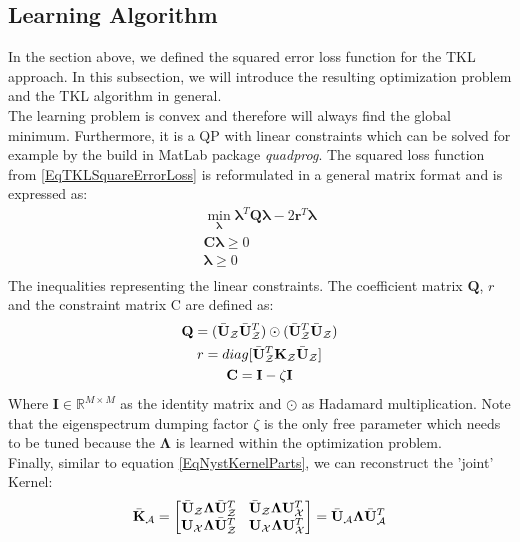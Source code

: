 \subsection{Learning Algorithm}\label{InSubSecLearnAlgo}
In the section above, we defined the squared error loss function for the \acs{TKL} approach.
In this subsection, we will introduce the resulting optimization problem and the \acs{TKL} algorithm in general.\\
The learning problem is convex and therefore will always find the global minimum.
Furthermore, it is a \ac{QP} with linear constraints which can be solved for example by the build in MatLab package \textit{quadprog}.
The squared loss function from \eqref{EqTKLSquareErrorLoss} is reformulated in a general matrix format and is expressed as:\cite{Long.}
\begin{equation}\label{EqTklQP}
	\begin{gathered}
		\min_{\boldsymbol{\lambda}} \boldsymbol{\lambda}^T \mathbf{Q} \boldsymbol{\lambda} - 2\mathbf{r}^T\boldsymbol{\lambda}\\
		\mathbf{C}\boldsymbol{\lambda} \ge 0 \\
		\boldsymbol{\lambda} \ge 0 \\
	\end{gathered}
\end{equation}
The inequalities representing the linear constraints.
The coefficient matrix $\mathbf{Q}$, $r$ and the constraint matrix C are defined as:
\begin{equation}\label{EqTklQPCons}
		\begin{gathered}
			\mathbf{Q} = (\bar{\mathbf{U}}_\mathcal{Z} \bar{\mathbf{U}}_\mathcal{Z}^T)\odot (\bar{\mathbf{U}}_\mathcal{Z}^T \bar{\mathbf{U}}_\mathcal{Z})\\
			r = diag[\bar{\mathbf{U}}_\mathcal{Z}^T \mathbf{K}_\mathcal{Z} \bar{\mathbf{U}}_\mathcal{Z}]\\
			\mathbf{C} = \mathbf{I} - \zeta \mathbf{I}
		\end{gathered}
\end{equation}
Where $\mathbf{I} \in \mathbb{R}^{M\times M}$ as the identity matrix and $\odot$ as Hadamard multiplication.
Note that the eigenspectrum dumping factor $\zeta$ is the only free parameter which needs to be tuned because the $\boldsymbol{\Lambda}$ is learned within the optimization problem.\\
Finally, similar to equation \ref{EqNystKernelParts}, we can reconstruct the 'joint' Kernel:\cite{Long.}
\begin{equation}\label{EqTKLKernel}
	\bar{\mathbf{K}}_\mathcal{A} = 
	\begin{bmatrix}
	 \bar{\mathbf{U}}_\mathcal{Z} \boldsymbol{\Lambda} \bar{\mathbf{U}}_\mathcal{Z}^T \>\>\>\> \bar{\mathbf{U}}_\mathcal{Z} \boldsymbol{\Lambda} \mathbf{U}_\mathcal{X}^T \\
	 \mathbf{U}_\mathcal{X} \boldsymbol{\Lambda} \bar{\mathbf{U}}_\mathcal{Z}^T \>\>\>\> \mathbf{U}_\mathcal{X} \boldsymbol{\Lambda} \mathbf{U}_\mathcal{X}^T 
	\end{bmatrix}
	= 	 \bar{\mathbf{U}}_\mathcal{A} \boldsymbol{\Lambda} \bar{\mathbf{U}}_\mathcal{A}^T 
\end{equation}
